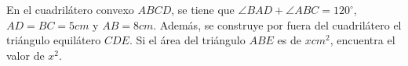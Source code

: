 En el cuadrilátero convexo $ABCD$, se tiene que $\angle BAD + \angle ABC = 120^\circ$, $AD = BC = 5 cm$ y $AB = 8 cm$. Además, se construye por fuera del cuadrilátero el triángulo equilátero $CDE$. Si el área del triángulo $ABE$ es de $x cm^2$, encuentra el valor de $x^2$.